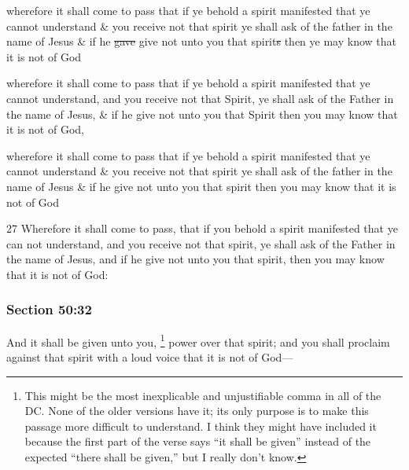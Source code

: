 		\begin{framed}
		\scriptsize
			\begin{compactdesc}
				\item[JSP] wherefore it shall come to pass that if ye behold a spirit manifested that ye cannot understand \& you receive not that spirit ye shall ask of the father in the name of Jesus \& if he \sout{gave} give not unto you that spirit\sout{s} then ye may know that it is not of God
				\item[Gilbert] wherefore it shall come to pass that if ye behold a spirit manifested that ye cannot understand, and you receive not that Spirit, ye shall ask of the Father in the name of Jesus, \& if he give not unto you that Spirit then you may know that it is not of God,
				\item[Hyde and Smith] wherefore it shall come to pass that if ye behold a spirit manifested that ye cannot understand \& you receive not that spirit ye shall ask of the father in the name of Jesus \& if he give not unto you that spirit then you may know that it is not of God
				\item[BC] 27 Wherefore it shall come to pass, that if you behold a spirit manifested that ye can not understand, and you receive not that spirit, ye shall ask of the Father in the name of Jesus, and if he give not unto you that spirit, then you may know that it is not of God:
			\end{compactdesc}
		\end{framed}

	\subsubsection{Section 50:32} %
		\label{DC50-32}

		And it shall be given unto you,%
			\footnote{%
				This might be the most inexplicable and unjustifiable comma in all of the DC. None of the older versions have it; its only purpose is to make this passage more difficult to understand. I think they might have included it because the first part of the verse says ``it shall be given'' instead of the expected ``there shall be given,'' but I really don't know. 
				}
		power over that spirit; and you shall proclaim against that spirit with a loud voice that it is not of God---


